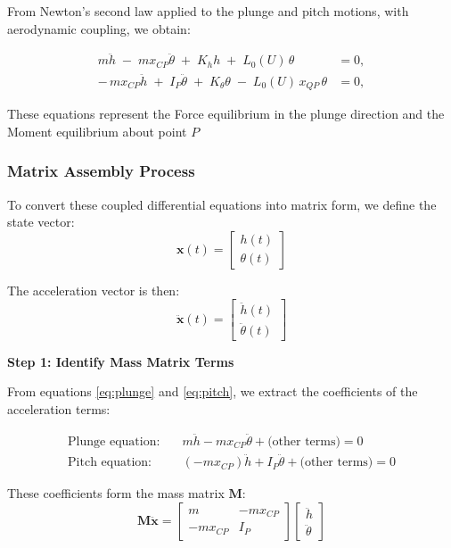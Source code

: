 \documentclass{article}
\begin{document}
From Newton's second law applied to the plunge and pitch motions, with aerodynamic coupling, we obtain:

\begin{align}
m\ddot h \;-\; m x_{CP}\ddot\theta \;+\; K_h h \;+\; L_0(U)\,\theta &= 0, \label{eq:plunge}\\
-\,m x_{CP}\ddot h \;+\; I_P \ddot \theta \;+\; K_\theta \theta \;-\; L_0(U)\,x_{QP}\,\theta &= 0, \label{eq:pitch}
\end{align}

These equations represent the Force equilibrium in the plunge direction and the Moment equilibrium about point $P$

\subsubsection{Matrix Assembly Process}

To convert these coupled differential equations into matrix form, we define the state vector:
\begin{equation}
\bm{x}(t) = \begin{bmatrix} h(t) \\ \theta(t) \end{bmatrix}
\label{eq:state_vector}
\end{equation}

The acceleration vector is then:
\begin{equation}
\ddot{\bm{x}}(t) = \begin{bmatrix} \ddot{h}(t) \\ \ddot{\theta}(t) \end{bmatrix}
\label{eq:acceleration_vector}
\end{equation}

\textbf{Step 1: Identify Mass Matrix Terms}

From equations \eqref{eq:plunge} and \eqref{eq:pitch}, we extract the coefficients of the acceleration terms:

\begin{align}
\text{Plunge equation:} \quad &m\ddot{h} - m x_{CP}\ddot{\theta} + \text{(other terms)} = 0 \\
\text{Pitch equation:} \quad &(-m x_{CP})\ddot{h} + I_P\ddot{\theta} + \text{(other terms)} = 0
\end{align}

These coefficients form the mass matrix $\mathbf{M}$:
\begin{equation}
\mathbf{M} \ddot{\bm{x}} = \begin{bmatrix}
m & -m x_{CP} \\
-m x_{CP} & I_P
\end{bmatrix}
\begin{bmatrix} \ddot{h} \\ \ddot{\theta} \end{bmatrix}
\label{eq:mass_matrix_form}
\end{equation}
\end{document}
